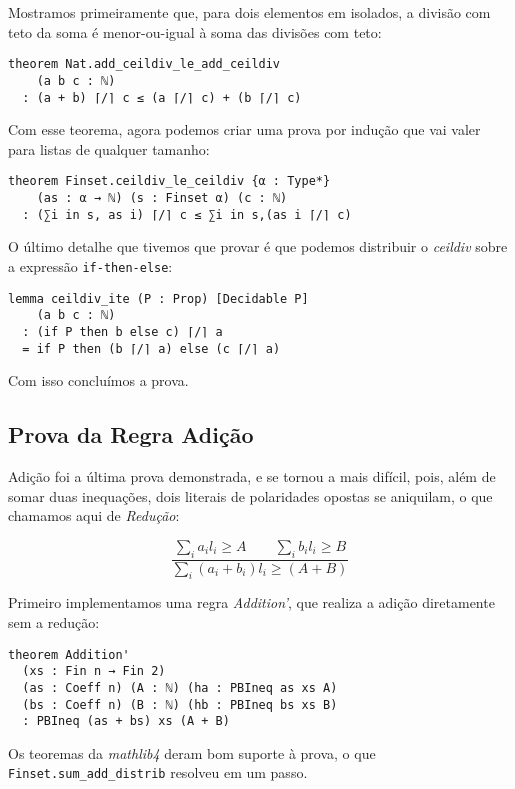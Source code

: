 \documentclass[conference]{IEEEtran}
\begin{document}
Mostramos primeiramente que, para dois elementos em isolados, a divisão com teto da soma é menor-ou-igual à soma das divisões com teto:
\begin{verbatim}
theorem Nat.add_ceildiv_le_add_ceildiv
    (a b c : ℕ)
  : (a + b) ⌈/⌉ c ≤ (a ⌈/⌉ c) + (b ⌈/⌉ c) 
\end{verbatim}

Com esse teorema, agora podemos criar uma prova por indução que vai valer para listas de qualquer tamanho:
\begin{verbatim}
theorem Finset.ceildiv_le_ceildiv {α : Type*}
    (as : α → ℕ) (s : Finset α) (c : ℕ)
  : (∑i in s, as i) ⌈/⌉ c ≤ ∑i in s,(as i ⌈/⌉ c)
\end{verbatim}

O último detalhe que tivemos que provar é que podemos distribuir o \textit{ceildiv} sobre a expressão \texttt{if-then-else}:
\begin{verbatim}
lemma ceildiv_ite (P : Prop) [Decidable P]
    (a b c : ℕ)
  : (if P then b else c) ⌈/⌉ a
  = if P then (b ⌈/⌉ a) else (c ⌈/⌉ a)
\end{verbatim}

Com isso concluímos a prova.



\subsection{Prova da Regra Adição}
Adição foi a última prova demonstrada, e se tornou a mais difícil, pois, além de somar duas inequações,
dois literais de polaridades opostas se aniquilam, o que chamamos aqui de \textit{Redução}:

\begin{equation}
    \frac
    {{\sum_i{a_i l_i} \ge A}\qquad {\sum_i{b_i l_i} \ge B}}
    {\sum_i{(a_i + b_i) l_i} \ge (A+B)}
\end{equation}

Primeiro implementamos uma regra \textit{Addition'}, que realiza a adição diretamente sem a redução:

\begin{verbatim}
theorem Addition'
  (xs : Fin n → Fin 2)
  (as : Coeff n) (A : ℕ) (ha : PBIneq as xs A)
  (bs : Coeff n) (B : ℕ) (hb : PBIneq bs xs B)
  : PBIneq (as + bs) xs (A + B)
\end{verbatim}

Os teoremas da \textit{mathlib4} deram bom suporte à prova, o que \texttt{Finset.sum\_add\_distrib} resolveu em um passo.
\end{document}
